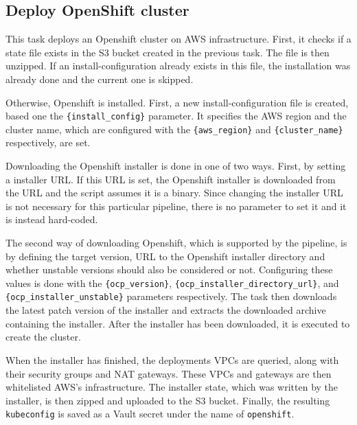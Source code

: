 \subsection{Deploy OpenShift cluster}\label{subsec:deploy-openshift-cluster}

This task deploys an Openshift cluster on AWS infrastructure.
First, it checks if a state file exists in the S3 bucket created in the previous task.
The file is then unzipped.
If an install-configuration already exists in this file, the installation was already done and the current one is skipped.

Otherwise, Openshift is installed.
First, a new install-configuration file is created, based one the \verb|{install_config}| parameter.
It specifies the AWS region and the cluster name, which are configured with the \verb|{aws_region}| and \verb|{cluster_name}| respectively, are set.

Downloading the Openshift installer is done in one of two ways.
First, by setting a installer URL.
If this URL is set, the Openshift installer is downloaded from the URL and the script assumes it is a binary.
Since changing the installer URL is not necessary for this particular pipeline, there is no parameter to set it and it is instead hard-coded.

The second way of downloading Openshift, which is supported by the pipeline, is by defining the target version, URL to the Openshift installer directory and whether unstable versions should also be considered or not.
Configuring these values is done with the \verb|{ocp_version}|, \verb|{ocp_installer_directory_url}|, and \verb|{ocp_installer_unstable}| parameters respectively.
The task then downloads the latest patch version of the installer and extracts the downloaded archive containing the installer.
After the installer has been downloaded, it is executed to create the cluster.

When the installer has finished, the deployments VPCs are queried, along with their security groups and NAT gateways.
These VPCs and gateways are then whitelisted AWS's infrastructure.
The installer state, which was written by the installer, is then zipped and uploaded to the S3 bucket.
Finally, the resulting \verb|kubeconfig| is saved as a Vault secret under the name of \verb|openshift|.

